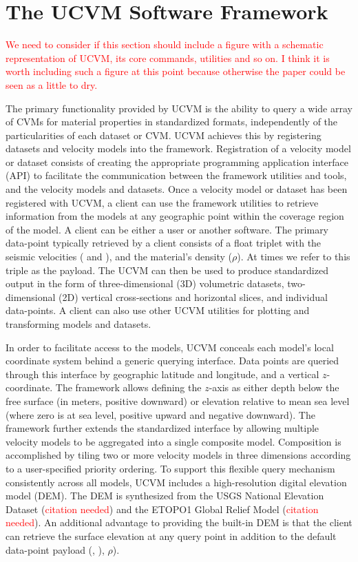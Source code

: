 


\section{The UCVM Software Framework}\label{sec:ucvm}

\textcolor{red}{We need to consider if this section should include a figure with a schematic representation of UCVM, its core commands, utilities and so on. I think it is worth including such a figure at this point because otherwise the paper could be seen as a little to dry.}

The primary functionality provided by UCVM is the ability to query a wide array of CVMs for material properties in standardized formats, independently of the particularities of each dataset or CVM. UCVM achieves this by registering datasets and velocity models into the framework. Registration of a velocity model or dataset consists of creating the appropriate programming application interface (API) to facilitate the communication between the framework utilities and tools, and the velocity models and datasets. Once a velocity model or dataset has been registered with UCVM, a client can use the framework utilities to retrieve information from the models at any geographic point within the coverage region of the model. A client can be either a user or another software. The primary data-point typically retrieved by a client consists of a float triplet with the seismic velocities (\vp{} and \vs{}), and the material's density ($\rho$). At times we refer to this triple as the payload. The UCVM can then be used to produce standardized output in the form of three-dimensional (3D) volumetric datasets, two-dimensional (2D) vertical cross-sections and horizontal slices, and individual data-points. A client can also use other UCVM utilities for plotting and transforming models and datasets.

In order to facilitate access to the models, UCVM conceals each model's local coordinate system behind a generic querying interface. Data points are queried through this interface by geographic latitude and longitude, and a vertical $z$-coordinate. The framework allows defining the $z$-axis as either depth below the free surface (in meters, positive downward) or elevation relative to mean sea level (where zero is at sea level, positive upward and negative downward). The framework further extends the standardized interface by allowing multiple velocity models to be aggregated into a single composite model. Composition is accomplished by tiling two or more velocity models in three dimensions according to a user-specified priority ordering. To support this flexible query mechanism consistently across all models, UCVM includes a high-resolution digital elevation model (DEM). The DEM is synthesized from the USGS National Elevation Dataset (\textcolor{red}{citation needed}) and the ETOPO1 Global Relief Model (\textcolor{red}{citation needed}). An additional advantage to providing the built-in DEM is that the client can retrieve the surface elevation at any query point in addition to the default data-point payload (\vp{}, \vs{}), $\rho$).

